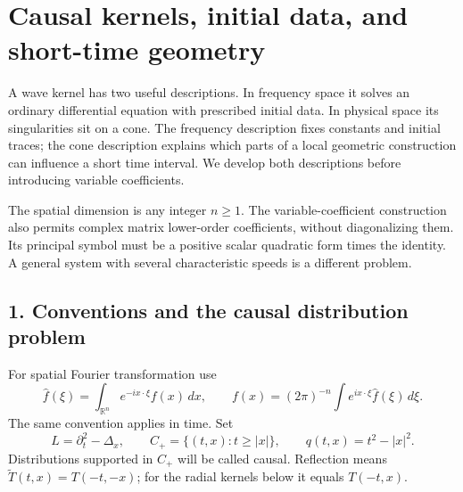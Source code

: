 \documentclass[
  11pt,
]{article}
\author{}
\date{}
\begin{document}
\section{Causal kernels, initial data, and short-time
geometry}\label{causal-kernels-initial-data-and-short-time-geometry}

A wave kernel has two useful descriptions. In frequency space it solves
an ordinary differential equation with prescribed initial data. In
physical space its singularities sit on a cone. The frequency
description fixes constants and initial traces; the cone description
explains which parts of a local geometric construction can influence a
short time interval. We develop both descriptions before introducing
variable coefficients.

The spatial dimension is any integer \(n\geq1\). The
variable-coefficient construction also permits complex matrix
lower-order coefficients, without diagonalizing them. Its principal
symbol must be a positive scalar quadratic form times the identity. A
general system with several characteristic speeds is a different
problem.

\subsection{1. Conventions and the causal distribution
problem}\label{conventions-and-the-causal-distribution-problem}

For spatial Fourier transformation use \[
 \widehat f(\xi)=\int_{\mathbb R^n}e^{-ix\cdot\xi}f(x)\,dx,
 \qquad f(x)=(2\pi)^{-n}\int e^{ix\cdot\xi}\widehat f(\xi)\,d\xi.
 \tag{W1}
\] The same convention applies in time. Set \[
 L=\partial_t^2-\Delta_x,\qquad
 C_+=\{(t,x):t\geq |x|\},\qquad q(t,x)=t^2-|x|^2.
 \tag{W2}
\] Distributions supported in \(C_+\) will be called causal. Reflection
means \(\widetilde T(t,x)=T(-t,-x)\); for the radial kernels below it
equals \(T(-t,x)\).
\end{document}
